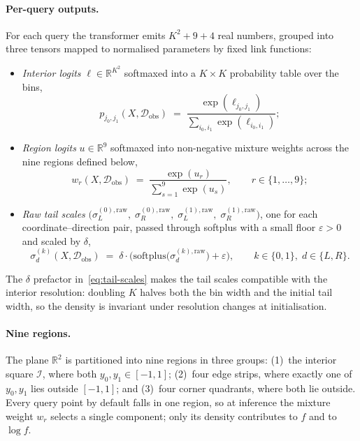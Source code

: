 \documentclass[11pt]{article}
\begin{document}
\paragraph{Per-query outputs.}
For each query the transformer emits $K^{2} + 9 + 4$ real numbers,
grouped into three tensors mapped to normalised parameters by fixed
link functions:
\begin{itemize}
  \item \emph{Interior logits} $\ell \in \mathbb{R}^{K^{2}}$ softmaxed
    into a $K \times K$ probability table over the bins,
    \begin{equation}
      p_{j_{0}, j_{1}}(X, \mathcal{D}_{\mathrm{obs}})
      \;=\;
      \frac{\exp(\ell_{j_{0}, j_{1}})}
           {\sum_{i_{0}, i_{1}} \exp(\ell_{i_{0}, i_{1}})};
      \label{eq:pmat-softmax}
    \end{equation}
  \item \emph{Region logits} $u \in \mathbb{R}^{9}$ softmaxed into
    non-negative mixture weights across the nine regions defined below,
    \begin{equation}
      w_{r}(X, \mathcal{D}_{\mathrm{obs}})
      \;=\; \frac{\exp(u_{r})}{\sum_{s = 1}^{9} \exp(u_{s})},
      \qquad r \in \{1, \ldots, 9\};
      \label{eq:region-weights}
    \end{equation}
  \item \emph{Raw tail scales}
    $\bigl(\sigma_{L}^{(0), \mathrm{raw}},\; \sigma_{R}^{(0), \mathrm{raw}},\;
           \sigma_{L}^{(1), \mathrm{raw}},\; \sigma_{R}^{(1), \mathrm{raw}}\bigr)$,
    one for each coordinate--direction pair, passed through softplus
    with a small floor $\varepsilon > 0$ and scaled by $\delta$,
    \begin{equation}
      \sigma_{d}^{(k)}(X, \mathcal{D}_{\mathrm{obs}})
      \;=\; \delta \cdot
      \bigl(\mathrm{softplus}\bigl(\sigma_{d}^{(k), \mathrm{raw}}\bigr)
            + \varepsilon\bigr),
      \qquad k \in \{0, 1\},\; d \in \{L, R\}.
      \label{eq:tail-scales}
    \end{equation}
\end{itemize}
The $\delta$ prefactor in~\eqref{eq:tail-scales} makes the tail scales
compatible with the interior resolution: doubling $K$ halves both the
bin width and the initial tail width, so the density is invariant under
resolution changes at initialisation.

\paragraph{Nine regions.}
The plane $\mathbb{R}^{2}$ is partitioned into nine regions in three groups: (1)~the interior square $\mathcal{I}$, where both $y_{0}, y_{1} \in [-1, 1]$; (2)~four edge strips, where exactly one of $y_{0}, y_{1}$ lies outside $[-1, 1]$; and (3)~four corner quadrants, where both lie outside. Every query point by default falls in one region, so at inference the
mixture weight $w_{r}$ selects a single component; only its density
contributes to $f$ and to $\log f$.
\end{document}
